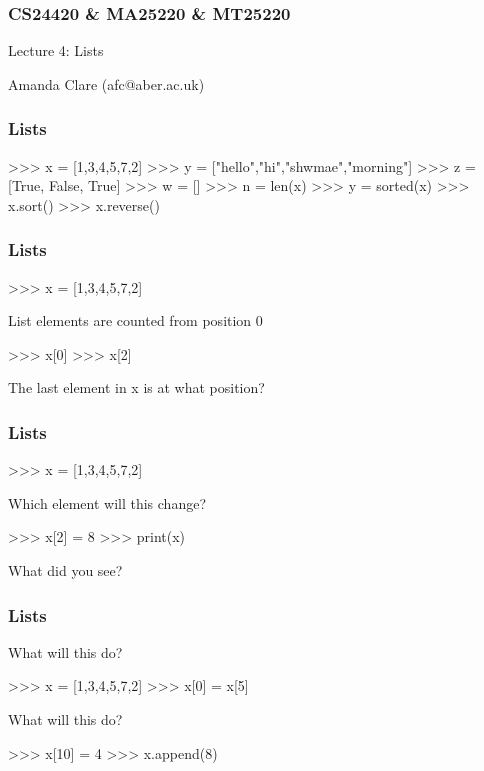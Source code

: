 \documentclass{beamer}
\begin{document}

\begin{frame}
\frametitle{CS24420 \& MA25220 \& MT25220}

\begin{center}
\begin{huge}
Lecture 4: Lists
\end{huge}
\bigskip

Amanda Clare (afc@aber.ac.uk)

\end{center}
\end{frame}


\begin{frame}[fragile]
\frametitle{Lists}
\begin{code}
>>> x = [1,3,4,5,7,2]
>>> y = ["hello","hi","shwmae","morning"]
>>> z = [True, False, True]
>>> w = []
>>> n = len(x)
>>> y = sorted(x)
>>> x.sort()
>>> x.reverse()
\end{code}
\end{frame}

\begin{frame}[fragile]
\frametitle{Lists}
\begin{code}
>>> x = [1,3,4,5,7,2]
\end{code}
 List elements are counted from position 0
\begin{code}
>>> x[0]
>>> x[2]
\end{code}
The last element in x is at what position?
\end{frame}

\begin{frame}[fragile]
\frametitle{Lists}
\begin{code}
>>> x = [1,3,4,5,7,2]
\end{code}
Which element will this change?
\begin{code}
>>> x[2] = 8
>>> print(x)
\end{code}
What did you see?
\end{frame}

\begin{frame}[fragile]
\frametitle{Lists}
What will this do?
\begin{code}
>>> x = [1,3,4,5,7,2]
>>> x[0] = x[5]
\end{code}
\bigskip
What will this do?
\begin{code}
>>> x[10] = 4
>>> x.append(8)
\end{code}
\end{frame}
\end{document}
